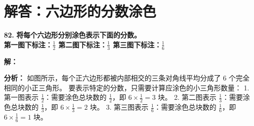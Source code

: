 \documentclass[12pt, a4paper]{ctexrep}
\begin{document}
\newpage

\section{解答：六边形的分数涂色}

\vspace{0.6cm}

\textbf{\LARGE 82.} \textbf{将每个六边形分别涂色表示下面的分数。\\[1ex]
第一图下标注：$\displaystyle\frac{1}{2}$ \qquad 第二图下标注：$\displaystyle\frac{1}{3}$ \qquad 第三图下标注：$\displaystyle\frac{1}{6}$}

\vspace{0.4cm}
\textbf{解：}

\textbf{分析：}
如图所示，每个正六边形都被内部相交的三条对角线平均分成了 $6$ 个完全相同的小正三角形。
要表示特定的分数，只需要计算应涂色的小三角形数量：
1. 第一图表示 $\displaystyle\frac{1}{2}$：需要涂色总块数的 $\displaystyle\frac{1}{2}$，即 $6 \times \frac{1}{2} = 3$ 块。
2. 第二图表示 $\displaystyle\frac{1}{3}$：需要涂色总块数的 $\displaystyle\frac{1}{3}$，即 $6 \times \frac{1}{3} = 2$ 块。
3. 第三图表示 $\displaystyle\frac{1}{6}$：需要涂色总块数的 $\displaystyle\frac{1}{6}$，即 $6 \times \frac{1}{6} = 1$ 块。
\end{document}
